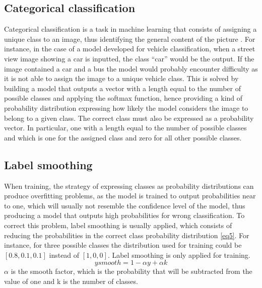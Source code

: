 \documentclass[journal,article,submit,pdftex,moreauthors]{Definitions/mdpi}
\begin{document}
\subsection{Categorical classification}
Categorical classification is a task in machine learning that consists of assigning a unique class to an image, thus identifying the general content of the picture \cite{Lorente2021ImageTechniques}. For instance, in the case of a model developed for vehicle classification, when a street view image showing a car is inputted, the class “car” would be the output. If the image contained a car and a bus the model would probably encounter difficulty as it is not able to assign the image to a unique vehicle class. This is solved by building a model that outputs a vector with a length equal to the number of possible classes and applying the softmax function, hence providing a kind of probability distribution expressing how likely the model considers the image to belong to a given class. The correct class must also be expressed as a probability vector. In particular, one with a length equal to the number of possible classes and which is one for the assigned class and zero for all other possible classes. 
\subsection{Label smoothing}
When training, the strategy of expressing classes as probability distributions can produce overfitting problems, as the model is trained to output probabilities near to one, which will usually not resemble the confidence level of the model, thus producing a model that outputs high probabilities for wrong classification. To correct this problem, label smoothing is usually applied, which consists of reducing the probabilities in the correct class probability distribution \ref{eq5}. For instance, for three possible classes the distribution used for training could be \([0.8,0.1,0.1]\) instead of \([1,0,0]\). Label smoothing is only applied for training.
\begin{equation} \label{eq5}
ysmooth = 1 - \alpha y+\alpha k
\end{equation}
\(\alpha\) is the smooth factor, which is the probability that will be subtracted from the value of one and k is the number of classes.
\end{document}
